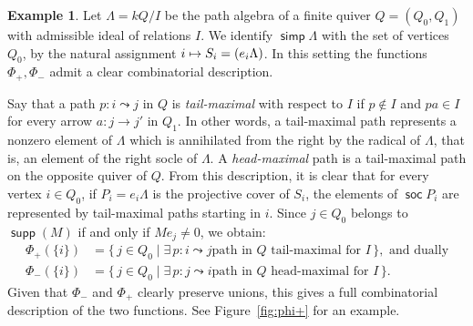\documentclass[a4paper,11pt]{amsart}
\theoremstyle{plain}
\theoremstyle{definition}
\newtheorem{ex}[thm]{Example}
\DeclareMathOperator{\simp}{\mathsf{simp}}
\DeclareMathOperator{\soc}{\mathsf{soc}}
\let\top\relax
\DeclareMathOperator{\top}{\mathsf{top}}
\DeclareMathOperator{\supp}{\mathsf{supp}}
\begin{document}
\begin{ex}\label{ex:path-algebra}
	Let $\Lambda=kQ/I$ be the path algebra of a finite quiver $Q=(Q_0,Q_1)$
	with admissible ideal of relations $I$. We identify $\simp\Lambda$ with the
	set of vertices $Q_0$, by the natural assignment $i\mapsto S_i=\top
	(e_i\Lambda)$. In this setting the functions $\Phi_+, \Phi_-$ admit a
	clear combinatorial description.

	Say that a path $p\colon i\leadsto j$ in $Q$ is \emph{tail-maximal} with
	respect to $I$ if $p\notin I$ and $pa\in I$ for every arrow $a\colon j\to j'$
	in $Q_1$. In other
	words, a tail-maximal path represents a nonzero element of $\Lambda$ which is
	annihilated from the right by the radical of $\Lambda$, that is,
	an element of the right socle of $\Lambda$. A
	\emph{head-maximal} path is a tail-maximal path on the opposite quiver of $Q$.
	From this description, it is clear that for every vertex $i\in Q_0$, if
	$P_i=e_i\Lambda$ is the projective cover of $S_i$, the elements of $\soc P_i$
	are represented by tail-maximal paths starting in $i$. Since $j\in Q_0$
	belongs to $\supp(M)$ if and only if $Me_j\neq 0$, we obtain:
	\begin{align*}
		\Phi_+(\{i\})&=\{\,j\in Q_0\mid \exists\, p\colon i\leadsto j\text{
			path in }Q\text{ tail-maximal for }I\,\},\text{ and dually}\\
		\Phi_-(\{i\})&=\{\,j\in Q_0\mid \exists\, p\colon j\leadsto i\text{
			path in }Q\text{ head-maximal for }I\,\}.
	\end{align*}
	Given that $\Phi_-$ and $\Phi_+$ clearly preserve unions, this gives a full
	combinatorial description of the two functions. See Figure~\ref{fig:phi+} for an
	example.
\end{ex}
\end{document}

